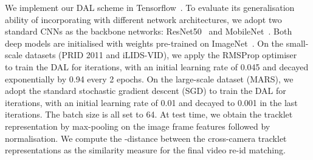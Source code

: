 \documentclass{bmvc2k}
\begin{document}
\vspace{0.1em}
We implement our DAL scheme in Tensorflow~\cite{abadi2016tensorflow}. 
To evaluate its generalisation ability of incorporating with different network architectures, 
we adopt two standard CNNs    
as the backbone networks: ResNet50~\cite{he2016deep} and MobileNet~\cite{howard2017mobilenets}. 
Both deep models are initialised with weights pre-trained on ImageNet~\cite{deng2009imagenet}.
On the small-scale datasets (PRID 2011 and iLIDS-VID), we apply the RMSProp optimiser~\cite{tieleman2012lecture} to train the DAL for  iterations, with an initial learning rate of 0.045 and decayed exponentially by 0.94 every 2 epochs.
On the large-scale dataset (MARS), we adopt the standard stochastic gradient descent (SGD) to train the DAL for  iterations, with an initial learning rate of 0.01 and decayed to 0.001 in the last  iterations. 
The batch size is all set to 64. 
At test time, 
we obtain the tracklet representation
by max-pooling on the image frame features
followed by
 normalisation.
We compute the -distance between the cross-camera tracklet representations as the similarity measure for the final video re-id matching.
\end{document}
